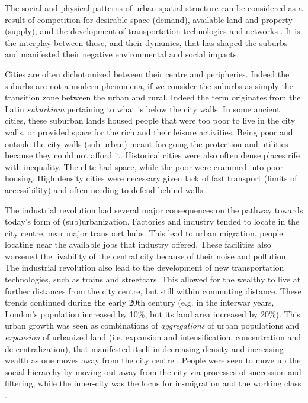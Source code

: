 The social and physical patterns of urban spatial structure can be considered as a result of competition for desirable space (demand), available land and property (supply), and the development of transportation technologies and networks \cite{alonso_location_1964,anas_urban_1998}. It is the interplay between these, and their dynamics, that has shaped the suburbs and manifested their negative environmental and social impacts.

Cities are often dichotomized between their centre and peripheries. Indeed the suburbs are not a modern phenomena, if we consider the suburbs as simply the transition zone between the urban and rural. Indeed the term originates from the Latin \textit{suburbium} pertaining to what is below the city walls. In some ancient cities, these suburban lands housed people that were too poor to live in the city walls, or provided space for the rich and their leisure activities. Being poor and outside the city walls (sub-urban) meant foregoing the protection and utilities because they could not afford it. Historical cities were also often dense places rife with inequality. The elite had space, while the poor were crammed into poor housing. High density cities were necessary given lack of fast transport (limits of accessibility) and often needing to defend behind walls \cite{bruegmann_sprawl:_2008}.

The industrial revolution had several major consequences on the pathway towards today's form of (sub)urbanization. Factories and industry tended to locate in the city centre, near major transport hubs. This lead to urban migration, people locating near the available jobs that industry offered. These facilities also worsened the livability of the central city because of their noise and pollution. The industrial revolution also lead to the development of new transportation technologies, such as trains and streetcars. This allowed for the wealthy to live at further distances from the city centre, but still within commuting distance. These trends continued during the early 20th century (e.g. in the interwar years, London's population increased by 10\%, but its land area increased by 20\%). This urban growth was seen as combinations of \textit{aggregations} of urban populations and \textit{expansion} of urbanized land (i.e. expansion and intensification, concentration and de-centralization), that manifested itself in decreasing density and increasing wealth as one moves away from the city centre \cite{burgess_growth_1925}. People were seen to move up the social hierarchy by moving out away from the city via processes of succession and filtering, while the inner-city was the locus for in-migration and the working class \cite{burgess_growth_1925}.

